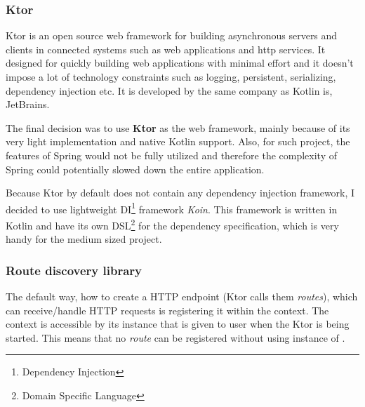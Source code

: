 \subsubsection{Ktor}
Ktor is an open source web framework for building asynchronous servers 
and clients in connected systems such as web applications and http services.
It designed for quickly building web applications with minimal effort 
and it doesn't impose a lot of technology constraints such as logging, persistent, serializing, dependency injection etc.
It is developed by the same company as Kotlin is, JetBrains.


\bigskip
The final decision was to use \textbf{Ktor} as the web framework,
mainly because of its very light implementation and native Kotlin support.
Also, for such project, 
the features of Spring would not be fully utilized
and therefore the complexity of Spring could potentially slowed down the entire application.

Because Ktor by default does not contain any dependency injection framework, 
I decided to use lightweight DI\footnote{Dependency Injection} framework \textit{Koin}.
This framework is written in Kotlin and have its own DSL\footnote{Domain Specific Language} for the dependency specification,
which is very handy for the medium sized project.

\subsubsection{Route discovery library}
The default way, how to create a HTTP endpoint (Ktor calls them \textit{routes}),
which can receive/handle HTTP requests is registering it within the  context.
The  context is accessible by its instance that is given to user when the Ktor is being started.
This means that no \textit{route} can be registered without using instance of .

